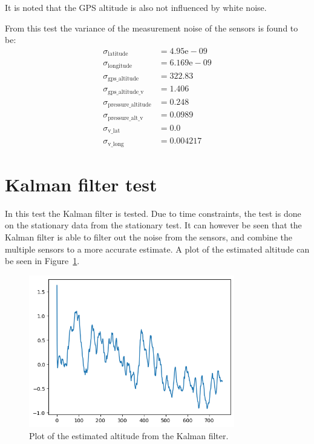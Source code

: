 It is noted that the GPS altitude is also not influenced by white noise.

From this test the variance of the measurement noise of the sensors is found to be:
\begin{align}
    \sigma_{\text{latitude}} &= 4.95\mathrm{e}-09\nonumber\\
    \sigma_{\text{longitude}} &= 6.169\mathrm{e}-09\nonumber\\
    \sigma_{\text{gps\_altitude}} &= 322.83\nonumber \\
    \sigma_{\text{gps\_altitude\_v}} &= 1.406 \nonumber\\
    \sigma_{\text{pressure\_altitude}} &= 0.248 \nonumber\\
    \sigma_{\text{pressure\_alt\_v}} &= 0.0989\nonumber\\
    \sigma_{\text{v\_lat}} &= 0.0\nonumber\\
    \sigma_{\text{v\_long}} &= 0.004217 \nonumber
\end{align}


\section{Kalman filter test}\label{sec:kalman-filter-test}
In this test the Kalman filter is tested.
Due to time constraints, the test is done on the stationary data from the stationary test.
It can however be seen that the Kalman filter is able to filter out the noise from the sensors, and combine the multiple sensors to a more accurate estimate.
A plot of the estimated altitude can be seen in Figure~\ref{fig:kalman-filter-test}.

\begin{figure}[H]
    \centering
    \includegraphics[width=0.8\textwidth]{chapters/05Results/figures/filtered_alt_only}
    \caption{Plot of the estimated altitude from the Kalman filter.}
    \label{fig:kalman-filter-test}
\end{figure}

